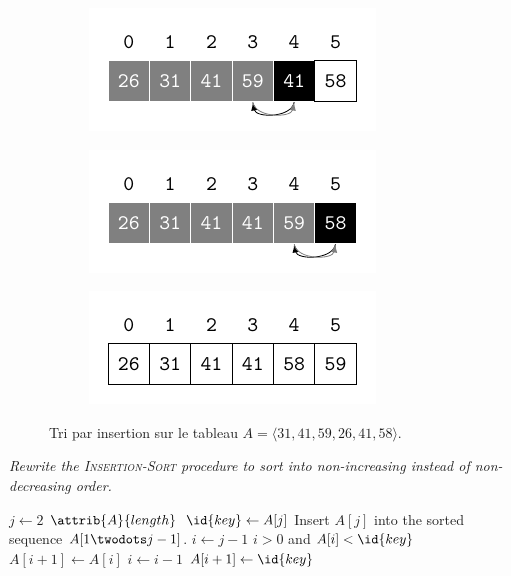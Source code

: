\begin{description}
\begin{ex}
\begin{figure}[H]
\begin{subfigure}[t]{.45\textwidth}
          \caption{}\label{fig:2_1-1_3}
        \end{subfigure}
        \begin{subfigure}[t]{.45\textwidth}
          \centering
          \includegraphics[scale=1]{img/2_1-1/2_1-1_4.pdf}
          \caption{}\label{fig:2_1-1_4}
        \end{subfigure}
        \begin{subfigure}[t]{.45\textwidth}
          \centering
          \includegraphics[scale=1]{img/2_1-1/2_1-1_5.pdf}
          \caption{}\label{fig:2_1-1_5}
        \end{subfigure}
        \begin{subfigure}[t]{.45\textwidth}
          \centering
          \includegraphics[scale=1]{img/2_1-1/2_1-1_6.pdf}
          \caption{}\label{fig:2_1-1_6}
        \end{subfigure}
        \caption{Tri par insertion sur le tableau $A = \langle 31, 41, 59, 26, 41, 58 \rangle$.} 
      \end{figure}
    \end{ex}

 {\itshape Rewrite the {\scshape Insertion-Sort} procedure to sort into non-increasing instead of non-decreasing order.}
    \begin{ex}
\begin{codebox}
  \li \For $j \gets 2$ \To $\attrib{A}{length}$
  \li \Do
  $\id{key} \gets A[j]$
  \li \Comment Insert $A[j]$ into the sorted sequence
  $A[1 \twodots j-1]$.
  \li $i \gets j-1$
  \li \While $i > 0$ and $A[i] < \id{key}$
  \li \Do
  $A[i+1] \gets A[i]$
  \li $i \gets i-1$
  \End
  \li $A[i+1] \gets \id{key}$
  \End
\end{codebox}
\end{ex}



\end{description}
